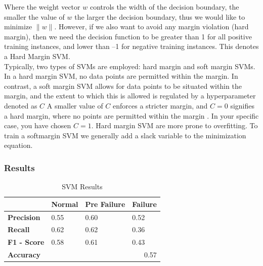 \documentclass{article}
\begin{document}
Where the weight vector $w$ controls the width of the decision boundary, the smaller the value of $w$ the larger the decision boundary, thus we would like to minimize $\|w\|$. However, if we also want to avoid
any margin violation (hard margin), then we need the decision function to be greater
than 1 for all positive training instances, and lower than –1 for negative training
instances. This denotes a Hard Margin SVM.\\

Typically, two types of SVMs are employed: hard margin and soft margin SVMs. In a hard margin SVM, no data points are permitted within the margin. In contrast, a soft margin SVM allows for data points to be situated within the margin, and the extent to which this is allowed is regulated by a hyperparameter denoted as $C$ A smaller value of $C$ enforces a stricter margin, and $C = 0$ signifies a hard margin, where no points are permitted within the margin \cite{Geron2019}. In your specific case, you have chosen $C = 1$. Hard margin SVM are more prone to overfitting. To train a softmargin SVM we generally add a slack variable to the minimization equation.

\subsubsection{Results}

\begin{table}[htbp]
\centering
\caption{SVM Results}
\begin{tabular}{|l|lll|}
\hline
                    & \multicolumn{1}{l|}{\textbf{Normal}} & \multicolumn{1}{l|}{\textbf{Pre Failure}} & \textbf{Failure} \\ \hline
\textbf{Precision}  & \multicolumn{1}{l|}{0.55}            & \multicolumn{1}{l|}{0.60}                 & 0.52             \\ \hline
\textbf{Recall}     & \multicolumn{1}{l|}{0.62}            & \multicolumn{1}{l|}{0.62}                 & 0.36             \\ \hline
\textbf{F1 - Score} & \multicolumn{1}{l|}{0.58}            & \multicolumn{1}{l|}{0.61}                 & 0.43             \\ \hline
\textbf{Accuracy}   & \multicolumn{3}{r|}{0.57}                                                                           \\ \hline
\end{tabular}
\end{table}
\end{document}

